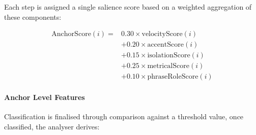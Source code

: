 Each step is assigned a single salience score based on a weighted
aggregation of these components:

\[
\begin{aligned}
\mathrm{AnchorScore}(i) ={}& 0.30 \times \mathrm{velocityScore}(i) \\
&+ 0.20 \times \mathrm{accentScore}(i) \\
&+ 0.15 \times \mathrm{isolationScore}(i) \\
&+ 0.25 \times \mathrm{metricalScore}(i) \\
&+ 0.10 \times \mathrm{phraseRoleScore}(i)
\end{aligned}
\]

\paragraph{Anchor Level Features}\label{anchor-level-features}

Classification is finalised through comparison against a threshold
value, once classified, the analyser derives:

